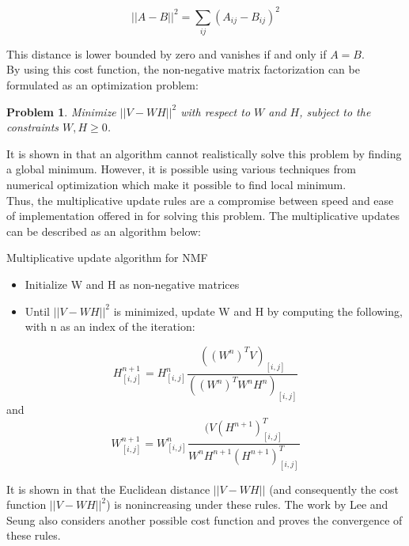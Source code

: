 \documentclass[thesis=M,english]{FITthesis}[2012/10/20]
\newtheorem{problem}{Problem}
\begin{document}
\begin{equation}
||A - B||^2 = \sum_{ij}(A_{ij} - B_{ij})^2
\end{equation}

This distance is lower bounded by zero and vanishes if and only if $A = B$.
\\

By using this cost function, the non-negative matrix factorization can be
formulated as an optimization problem:
\begin{problem}
  Minimize $||V - WH||^2$ with respect to $W$ and $H$, subject to the constraints
$W, H \geq 0$.
\end{problem}
It is shown in \cite{lee-algos} that an algorithm cannot realistically solve this
problem by finding a global minimum. However, it is possible using various
techniques from numerical optimization which make it possible to find
local minimum.
\\

Thus, the multiplicative update rules are a compromise between speed and
ease of implementation offered in \cite{lee-algos} for solving this
problem. The multiplicative updates can be described as an algorithm below:
\\

\begin{algorithm}[H]
  \caption{Multiplicative update algorithm for NMF}
  \begin{itemize}
    \item Initialize W and H as non-negative matrices\\
    \item Until $||V - WH||^2$ is minimized, update W and H by computing the
following, with n as an index of the iteration:\\
  \end{itemize}
  \begin{equation}
    H^{n+1}_{[i,j]} = H^{n}_{[i,j]} \frac{((W^{n})^TV)_{[i,j]}}{((W^{n})^{T}W^{n}H^{n})_{[i,j]}}
  \end{equation}
  and
  \begin{equation}
    W^{n+1}_{[i,j]} = W^{n}_{[i,j]} \frac{(V(H^{n+1})^{T}_{[i,j]}}{W^{n}H^{n+1}(H^{n+1})^{T}_{[i,j]}}
  \end{equation}
\end{algorithm}

It is shown in \cite{lee-algos} that the Euclidean distance $||V - WH||$ (and
consequently the cost function $||V - WH||^2$) is nonincreasing under these
rules. The work by Lee and Seung also considers another possible cost function and
proves the convergence of these rules.
\\
\end{document}
